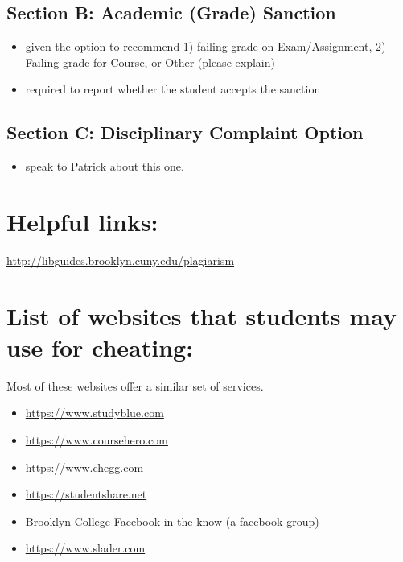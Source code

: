 \documentclass[]{book}
\providecommand{\tightlist}{%
  \setlength{\itemsep}{0pt}\setlength{\parskip}{0pt}}
\theoremstyle{definition}
\theoremstyle{definition}
\theoremstyle{definition}
\theoremstyle{remark}
\begin{document}
\subsection{Section B: Academic (Grade)
Sanction}\label{section-b-academic-grade-sanction}

\begin{itemize}
\tightlist
\item
  given the option to recommend 1) failing grade on Exam/Assignment, 2)
  Failing grade for Course, or Other (please explain)
\item
  required to report whether the student accepts the sanction
\end{itemize}

\subsection{Section C: Disciplinary Complaint
Option}\label{section-c-disciplinary-complaint-option}

\begin{itemize}
\tightlist
\item
  speak to Patrick about this one.
\end{itemize}

\section{Helpful links:}\label{helpful-links}

\url{http://libguides.brooklyn.cuny.edu/plagiarism}

\section{List of websites that students may use for
cheating:}\label{list-of-websites-that-students-may-use-for-cheating}

Most of these websites offer a similar set of services.

\begin{itemize}
\tightlist
\item
  \url{https://www.studyblue.com}
\item
  \url{https://www.coursehero.com}
\item
  \url{https://www.chegg.com}
\item
  \url{https://studentshare.net}
\item
  Brooklyn College Facebook in the know (a facebook group)
\item
  \url{https://www.slader.com}
\end{itemize}
\end{document}
